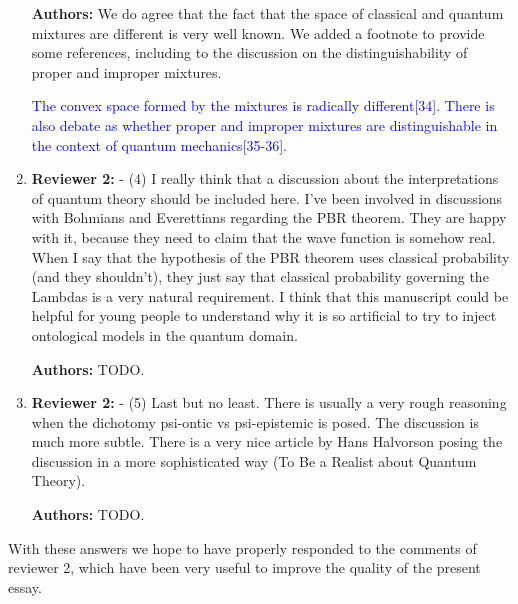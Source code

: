 \documentclass[11pt, executivepaper]{article}
\begin{document}
\begin{enumerate}
\textbf{Authors:} We do agree that the fact that the space of classical and quantum mixtures are different is very well known. We added a footnote to provide some references, including to the discussion on the distinguishability of proper and improper mixtures.

\textcolor{blue} {The convex space formed by the mixtures is radically different[34]. There is also debate as whether proper and improper mixtures are distinguishable in the context of quantum mechanics[35-36].
}

\item \textbf{Reviewer 2:} - (4)    I really think that a discussion about the interpretations of quantum theory should be included here. I’ve been involved in discussions with Bohmians and Everettians regarding the PBR theorem. They are happy with it, because they need to claim that the wave function is somehow real. When I say that the hypothesis of the PBR theorem uses classical probability (and they shouldn’t), they just say that classical probability governing the Lambdas is a very natural requirement. I think that this manuscript could be helpful for young people to understand why it is so artificial to try to inject ontological models in the quantum domain.
\vspace{2mm}

\textbf{Authors:} TODO.

\item \textbf{Reviewer 2:} - (5)    Last but no least. There is usually a very rough reasoning when the dichotomy psi-ontic vs psi-epistemic is posed. The discussion is much more subtle. There is a very nice article by Hans Halvorson posing the discussion in a more sophisticated way (To Be a Realist about Quantum Theory).
\vspace{2mm}

\textbf{Authors:} TODO.

\end{enumerate}



\noindent With these answers we hope to have properly responded to the comments of reviewer 2, which have been very useful to improve the quality of the present essay.

\clearpage


\end{document}
